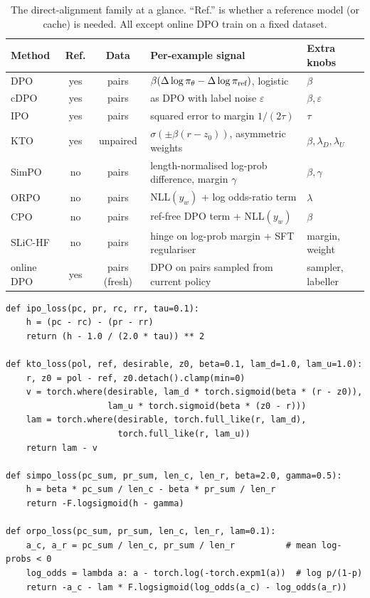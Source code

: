 \begin{table}[t]
\centering\small
\begin{tabularx}{\linewidth}{@{}lccXl@{}}
\toprule
\textbf{Method} & \textbf{Ref.} & \textbf{Data} & \textbf{Per-example signal} & \textbf{Extra knobs}\\
\midrule
DPO & yes & pairs & $\beta(\Delta\log\pi_\theta-\Delta\log\pi_{\text{ref}})$, logistic & $\beta$\\
cDPO & yes & pairs & as DPO with label noise $\varepsilon$ & $\beta,\varepsilon$\\
IPO & yes & pairs & squared error to margin $1/(2\tau)$ & $\tau$\\
KTO & yes & unpaired & $\sigma(\pm\beta(r-z_0))$, asymmetric weights & $\beta,\lambda_D,\lambda_U$\\
SimPO & no & pairs & length-normalised log-prob difference, margin $\gamma$ & $\beta,\gamma$\\
ORPO & no & pairs & NLL$(y_w)$ + log odds-ratio term & $\lambda$\\
CPO & no & pairs & ref-free DPO term + NLL$(y_w)$ & $\beta$\\
SLiC-HF & no & pairs & hinge on log-prob margin + SFT regulariser & margin, weight\\
online DPO & yes & pairs (fresh) & DPO on pairs sampled from current policy & sampler, labeller\\
\bottomrule
\end{tabularx}
\caption{The direct-alignment family at a glance. ``Ref.'' is whether a reference model (or cache)
is needed. All except online DPO train on a fixed dataset.}
\label{tab:dpo:family}
\end{table}

\begin{lstlisting}[caption={Four relatives in a few lines each (from \ident{llmsys/prefopt.py}). Sums are over response tokens; \code{len\_*} are token counts.},label={lst:dpo:family}]
def ipo_loss(pc, pr, rc, rr, tau=0.1):
    h = (pc - rc) - (pr - rr)
    return (h - 1.0 / (2.0 * tau)) ** 2

def kto_loss(pol, ref, desirable, z0, beta=0.1, lam_d=1.0, lam_u=1.0):
    r, z0 = pol - ref, z0.detach().clamp(min=0)
    v = torch.where(desirable, lam_d * torch.sigmoid(beta * (r - z0)),
                    lam_u * torch.sigmoid(beta * (z0 - r)))
    lam = torch.where(desirable, torch.full_like(r, lam_d),
                      torch.full_like(r, lam_u))
    return lam - v

def simpo_loss(pc_sum, pr_sum, len_c, len_r, beta=2.0, gamma=0.5):
    h = beta * pc_sum / len_c - beta * pr_sum / len_r
    return -F.logsigmoid(h - gamma)

def orpo_loss(pc_sum, pr_sum, len_c, len_r, lam=0.1):
    a_c, a_r = pc_sum / len_c, pr_sum / len_r          # mean log-probs < 0
    log_odds = lambda a: a - torch.log(-torch.expm1(a))  # log p/(1-p)
    return -a_c - lam * F.logsigmoid(log_odds(a_c) - log_odds(a_r))
\end{lstlisting}

